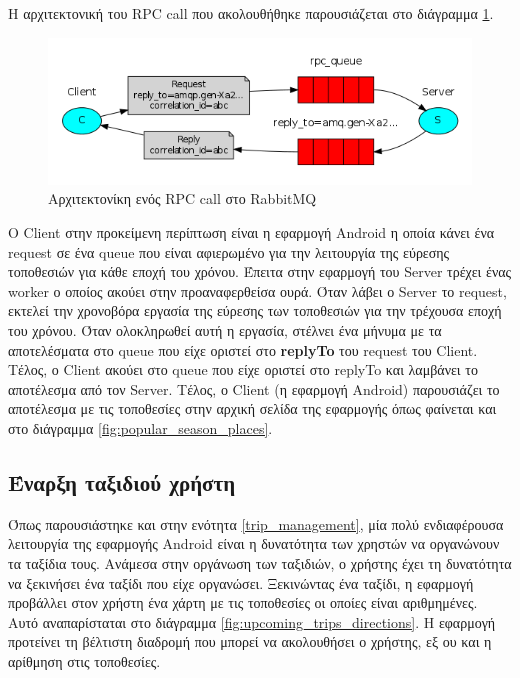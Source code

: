 \documentclass[oneside, 12pt]{book}
\begin{document}
Η αρχιτεκτονική του RPC call που ακολουθήθηκε παρουσιάζεται στο διάγραμμα \ref{fig:rabbitmq_rpc_call}.
\begin{figure}[h]
    \centering
    \includegraphics[width=\textwidth,height=\textheight,keepaspectratio]{images/rabbitmq_rpc_call.png}
    \caption{Αρχιτεκτονίκη ενός RPC call στο RabbitMQ}
    \label{fig:rabbitmq_rpc_call}
\end{figure}

Ο Client στην προκείμενη περίπτωση είναι η εφαρμογή Android η οποία κάνει ένα request σε ένα queue που είναι αφιερωμένο για την λειτουργία της εύρεσης τοποθεσιών για κάθε εποχή του χρόνου. 
Έπειτα στην εφαρμογή του Server τρέχει ένας worker ο οποίος ακούει στην προαναφερθείσα ουρά. 
Όταν λάβει ο Server το request, εκτελεί την χρονοβόρα εργασία της εύρεσης των τοποθεσιών για την τρέχουσα εποχή του χρόνου. 
Όταν ολοκληρωθεί αυτή η εργασία, στέλνει ένα μήνυμα με τα αποτελέσματα στο queue που είχε οριστεί στο \textbf{replyTo} του request του Client. 
Τέλος, ο Client ακούει στο queue που είχε οριστεί στο replyTo και λαμβάνει το αποτέλεσμα από τον Server. 
Τέλος, ο Client (η εφαρμογή Android) παρουσιάζει το αποτέλεσμα με τις τοποθεσίες στην αρχική σελίδα της εφαρμογής όπως φαίνεται και στο διάγραμμα \ref{fig:popular_season_places}.

\subsection{Έναρξη ταξιδιού χρήστη}\label{sec:start_user_trip}
Όπως παρουσιάστηκε και στην ενότητα \ref{trip_management}, μία πολύ ενδιαφέρουσα λειτουργία της εφαρμογής Android είναι η δυνατότητα των χρηστών να οργανώνουν τα ταξίδια τους.
Ανάμεσα στην οργάνωση των ταξιδιών, ο χρήστης έχει τη δυνατότητα να ξεκινήσει ένα ταξίδι που είχε οργανώσει. 
Ξεκινώντας ένα ταξίδι, η εφαρμογή προβάλλει στον χρήστη ένα χάρτη με τις τοποθεσίες οι οποίες είναι αριθμημένες. 
Αυτό αναπαρίσταται στο διάγραμμα \ref{fig:upcoming_trips_directions}. 
Η εφαρμογή προτείνει τη βέλτιστη διαδρομή που μπορεί να ακολουθήσει ο χρήστης, εξ ου και η αρίθμηση στις τοποθεσίες.
\end{document}
